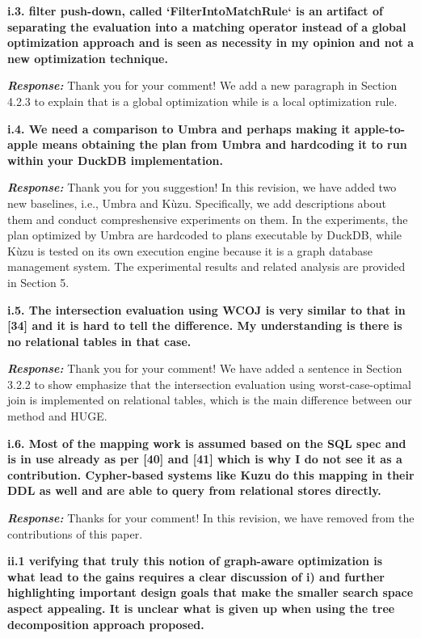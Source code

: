 \textbf{i.3. filter push-down, called `FilterIntoMatchRule` is an artifact of separating the evaluation into a matching operator instead of a global optimization approach and is seen as necessity in my opinion and not a new optimization technique.}

\textbf{\textit{Response: }}
Thank you for your comment! 
We add a new paragraph in Section 4.2.3 to explain that \filterrule is a global optimization while \fusionrule is a local optimization rule.


\textbf{
i.4. We need a comparison to Umbra and perhaps making it apple-to-apple means obtaining the plan from Umbra and hardcoding it to run within your DuckDB implementation.
}

\textbf{\textit{Response: }}
Thank you for you suggestion! 
In this revision, we have added two new baselines, i.e., Umbra and K\`uzu.
Specifically, we add descriptions about them and conduct compreshensive experiments on them.
In the experiments, the plan optimized by Umbra are hardcoded to plans executable by DuckDB, while K\`uzu is tested on its own execution engine because it is a graph database management system.
The experimental results and related analysis are provided in Section 5.


\textbf{
i.5. The intersection evaluation using WCOJ is very similar to that in [34] and it is hard to tell the difference. My understanding is there is no relational tables in that case.}

\textbf{\textit{Response: }}
Thank you for your comment! We have added a sentence in Section 3.2.2 to show emphasize that the intersection evaluation using worst-case-optimal join is implemented on relational tables, which is the main difference between our method and HUGE.


\textbf{
i.6. Most of the mapping work is assumed based on the SQL spec and is in use already as per [40] and [41] which is why I do not see it as a contribution. Cypher-based systems like Kuzu do this mapping in their DDL as well and are able to query from relational stores directly.}

\textbf{\textit{Response: }}
Thanks for your comment! 
In this revision, we have removed \rgmapping from the contributions of this paper.


\textbf{
ii.1 verifying that truly this notion of graph-aware optimization is what lead to the gains requires a clear discussion of i) and further highlighting important design goals that make the smaller search space aspect appealing.
It is unclear what is given up when using the tree decomposition approach proposed.}

